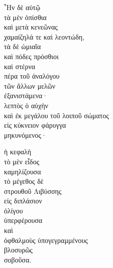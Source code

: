 {\large
\begin{greek}
\noindent ῏Ην δὲ αὐτῷ \\
τὰ μὲν ὀπίσθια \\
καὶ μετὰ κενεῶνας \\
\tabto{2em} χαμαίζηλά τε καὶ λεοντώδη, \\
τὰ δὲ ὠμιαῖα \\
καὶ πόδες πρόσθιοι \\
καὶ στέρνα \\
\tabto{2em} πέρα τοῦ ἀναλόγου \\
\tabto{4em} τῶν ἄλλων μελῶν \\
\tabto{6em} ἐξανιστάμενα· \\
λεπτὸς ὁ αὐχὴν \\
\tabto{2em} καὶ ἐκ μεγάλου τοῦ λοιποῦ σώματος \\
\tabto{4em} εἰς κύκνειον φάρυγγα \\
\tabto{6em} μηκυνόμενος·

ἡ κεφαλὴ\\
\tabto{2em} τὸ μὲν εἶδος \\
\tabto{4em} καμηλίζουσα\\
\tabto{2em} τὸ μέγεθος δὲ \\
\tabto{4em} στρουθοῦ Λιβύσσης \\
\tabto{6em} εἰς διπλάσιον \\
\tabto{8em} ὀλίγου \\
\tabto{10em} ὑπερφέρουσα \\
\tabto{4em} καὶ \\
\tabto{6em} ὀφθαλμοὺς ὑπογεγραμμένους \\
\tabto{8em} βλοσυρῶς \\
\tabto{10em} σοβοῦσα.\\

\end{greek}
}

